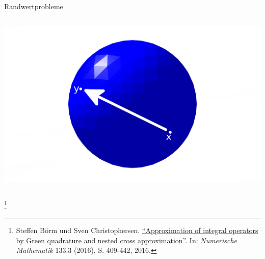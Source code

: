 \documentclass[10pt]{beamer}
\let\svthefootnote\thefootnote
\begin{document}
\begin{frame}{Randwertprobleme}
\begin{columns}
\begin{overprint}
        \includegraphics[width=1.5\linewidth]{figures/fg-sphere-full-inf.pdf}
      \end{overprint}

  \end{columns}
  \footnotesize
  \let\thefootnote\relax\footnote{Steffen Börm und Sven Christophersen.
  \href{https://link.springer.com/article/10.1007\%2Fs00211-015-0757-y}{
  ``Approximation of integral operators by Green quadrature and nested cross 
  approximation''}. In:   \textit{Numerische Mathematik} 133.3 (2016), S. 
  409-442, 2016.}
  \addtocounter{footnote}{-1}\let\thefootnote\svthefootnote\relax
  \normalsize
\end{frame}
\end{document}
